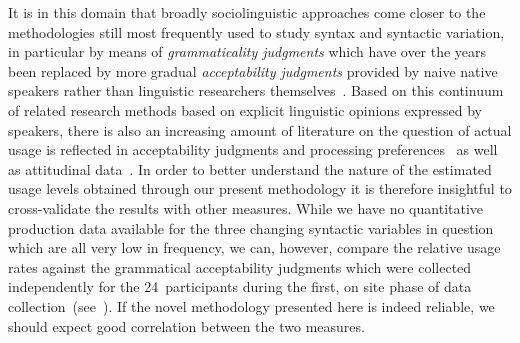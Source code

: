 It is in this domain that broadly sociolinguistic approaches come closer to the methodologies still most frequently used to study syntax and syntactic variation, in particular by means of \emph{grammaticality judgments} which have over the years been replaced by more gradual \emph{acceptability judgments} provided by naive native speakers rather than linguistic researchers themselves~\citep{Cornips2005}.
Based on this continuum of related research methods based on explicit linguistic opinions expressed by speakers, there is also an increasing amount of literature on the question of actual usage is reflected in acceptability judgments and processing preferences~\citep{Sorace2005,Featherston2005} as well as attitudinal data~\citep[see e.g.][]{Maegaard2013,Durham2014}.
In order to better understand the nature of the estimated usage levels obtained through our present methodology it is therefore insightful to cross-validate the results with other measures.
While we have no quantitative production data available for the three changing syntactic variables in question which are all very low in frequency,
we can, however, compare the relative usage rates against the grammatical acceptability judgments which were collected independently for the 24~participants during the first, on site phase of data collection~(see~\citealt{Jamieson2015}). %
If the novel methodology presented here is indeed reliable, we should expect good correlation between the two measures.

